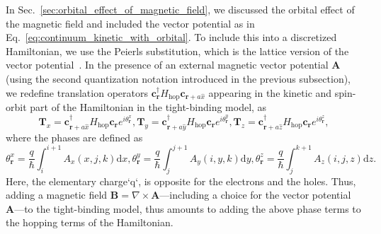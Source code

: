 In Sec.~\ref{sec:orbital_effect_of_magnetic_field}, we discussed the orbital effect of the magnetic field and included the vector potential as in Eq.~\eqref{eq:continuum_kinetic_with_orbital}.
To include this into a discretized Hamiltonian, we use the Peierls substitution, which is the lattice version of the vector potential~\cite{Peierls1933}.
In the presence of an external magnetic vector potential $\mathbf{A}$ (using the second quantization notation introduced in the previous subsection), we redefine translation operators $\bm{c}_{\bm{r}}^{\dagger}H_\textrm{hop}\bm{c}_{\bm{r}+a\hat{x}}$ appearing in the kinetic and spin-orbit part of the Hamiltonian in the tight-binding model, as
\begin{subequations}
\begin{equation}
\bm{T}_x = \bm{c}_{\bm{r}+a\hat{x}}^{\dagger}H_\textrm{hop}\bm{c}_{\bm{r}} e^{i \theta_{\bm{r}}^x},
\end{equation}
\begin{equation}
\bm{T}_y = \bm{c}_{\bm{r}+a\hat{y}}^{\dagger}H_\textrm{hop}\bm{c}_{\bm{r}} e^{i \theta_{\bm{r}}^y},
\end{equation}
\begin{equation}
\bm{T}_z = \bm{c}_{\bm{r}+a\hat{z}}^{\dagger}H_\textrm{hop}\bm{c}_{\bm{r}} e^{i \theta_{\bm{r}}^z},
\end{equation}
\end{subequations}
where the phases are defined as
\begin{subequations}
\begin{equation}
\theta_{\bm{r}}^{x}={\frac {q}{\hbar}} \int_{i}^{i+1}A_{x}(x,j,k){\text{d}}x,
\end{equation}
\begin{equation}
\theta_{\bm{r}}^{y}={\frac {q}{\hbar}} \int_{j}^{j+1}A_{y}(i,y,k){\text{d}}y,
\end{equation}
\begin{equation}
\theta_{\bm{r}}^{z}={\frac {q}{\hbar}} \int_{j}^{k+1}A_{z}(i,j,z){\text{d}}z.
\end{equation}
\end{subequations}
Here, the elementary charge`q`, is opposite for the electrons and the holes.
Thus, adding a magnetic field $\bm{B}=\nabla \times \bm{A}$---including a choice for the vector potential $\bm{A}$---to the tight-binding model, thus amounts to adding the above phase terms to the hopping terms of the Hamiltonian.


